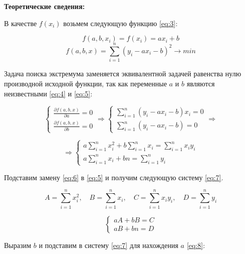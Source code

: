 \documentclass[a4paper, 12pt]{article}   	%
\begin{document}
\textbf{Теоретические сведения:}

В качестве $f(x_i)$ возьмем следующую функцию \eqref{eq:3}:

\begin{equation}\label{eq:3}
f(a, b, x_i) = f(x_i) = ax_i + b 
\end{equation}
\begin{equation*}
f(a, b, x) = \sum_{i = 1}^n (y_i - ax_i - b)^2 \to min
\end{equation*}

Задача поиска экстремума заменяется эквивалентной задачей равенства нулю производной исходной функции, так как переменные $a$ и $b$ являются неизвестными \eqref{eq:4} и \eqref{eq:5}:

\begin{equation}\label{eq:4}
\begin{cases}
\frac {\partial f(a, b, x)}{\partial a} = 0 
\\
\frac {\partial f(a, b, x)}{\partial b} = 0 
\end{cases}
\Rightarrow 
\begin{cases}
\sum^{n}_{i = 1} (y_i - ax_i - b)x_i = 0 
\\
\sum^{n}_{i = 1} (y_i - ax_i - b) = 0 
\end{cases}
\Rightarrow 
\end{equation}
 
\begin{equation}\label{eq:5}
\Rightarrow
\begin{cases}
a\sum^n_{i=1}x^2_i + b\sum^n_{i=1}x_i  = \sum^n_{i=1}x_i y_i 
\\
a\sum^n_{i=1}x_i + bn  = \sum^n_{i=1}y_i 
\end{cases}
\end{equation}

Подставим замену \eqref{eq:6} в \eqref{eq:5} и получим следующую систему \eqref{eq:7}.

\begin{equation}\label{eq:6}
A = \sum^n_{i=1}x^2_i, \quad
B = \sum^n_{i=1}x_i, \quad
C  = \sum^n_{i=1}x_i y_i, \quad
D = \sum^n_{i=1}y_i
\end{equation}


\begin{equation}\label{eq:7}
\begin{cases}
aA+ bB  = C
\\
aB + bn  = D
\end{cases}
\end{equation}

Выразим $b$ и подставим в систему \eqref{eq:7} для нахождения $a$ \eqref{eq:8}:
\end{document}
